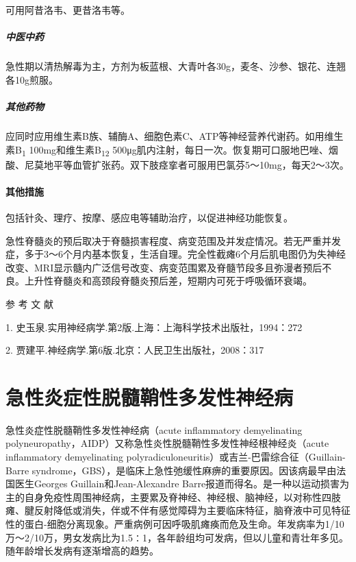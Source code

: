 可用阿昔洛韦、更昔洛韦等。

\paragraph{中医中药}

急性期以清热解毒为主，方剂为板蓝根、大青叶各30g，麦冬、沙参、银花、连翘各10g煎服。

\paragraph{其他药物}

应同时应用维生素B族、辅酶A、细胞色素C、ATP等神经营养代谢药。如用维生素B\textsubscript{1}
100mg和维生素B\textsubscript{12}
500μg肌内注射，每日一次。恢复期可口服地巴唑、烟酸、尼莫地平等血管扩张药。双下肢痉挛者可服用巴氯芬5～10mg，每天2～3次。

\subsubsection{其他措施}

包括针灸、理疗、按摩、感应电等辅助治疗，以促进神经功能恢复。

急性脊髓炎的预后取决于脊髓损害程度、病变范围及并发症情况。若无严重并发症，多于3～6个月内基本恢复，生活自理。完全性截瘫6个月后肌电图仍为失神经改变、MRI显示髓内广泛信号改变、病变范围累及脊髓节段多且弥漫者预后不良。上升性脊髓炎和高颈段脊髓炎预后差，短期内可死于呼吸循环衰竭。

\protect\hypertarget{text00259.html}{}{}

\hypertarget{text00259.htmlux5cux23CHP8-7-4}{}
参 考 文 献

1. 史玉泉.实用神经病学.第2版.上海：上海科学技术出版社，1994：272

2. 贾建平.神经病学.第6版.北京：人民卫生出版社，2008：317

\protect\hypertarget{text00260.html}{}{}

\chapter{急性炎症性脱髓鞘性多发性神经病}

急性炎症性脱髓鞘性多发性神经病（acute inflammatory demyelinating
polyneuropathy，AIDP）又称急性炎性脱髓鞘性多发性神经根神经炎（acute
inflammatory demyelinating
polyradiculoneuritis）或吉兰-巴雷综合征（Guillain-Barre
syndrome，GBS），是临床上急性弛缓性麻痹的重要原因。因该病最早由法国医生Georges
Guillain和Jean-Alexandre
Barre报道而得名。是一种以运动损害为主的自身免疫性周围神经病，主要累及脊神经、神经根、脑神经，以对称性四肢瘫、腱反射降低或消失，伴或不伴有感觉障碍为主要临床特征，脑脊液中可见特征性的蛋白-细胞分离现象。严重病例可因呼吸肌瘫痪而危及生命。年发病率为1/10万～2/10万，男女发病比为1.5∶1，各年龄组均可发病，但以儿童和青壮年多见。随年龄增长发病有逐渐增高的趋势。

